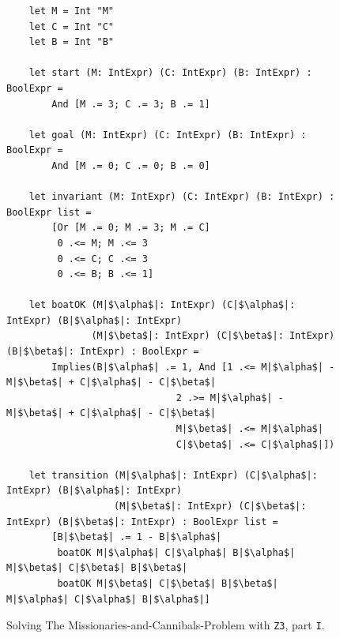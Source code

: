 \begin{figure}[!ht]
\centering
\begin{verbatim}
    let M = Int "M"
    let C = Int "C"
    let B = Int "B"

    let start (M: IntExpr) (C: IntExpr) (B: IntExpr) : BoolExpr =
        And [M .= 3; C .= 3; B .= 1]

    let goal (M: IntExpr) (C: IntExpr) (B: IntExpr) : BoolExpr =
        And [M .= 0; C .= 0; B .= 0]

    let invariant (M: IntExpr) (C: IntExpr) (B: IntExpr) : BoolExpr list =
        [Or [M .= 0; M .= 3; M .= C]
         0 .<= M; M .<= 3
         0 .<= C; C .<= 3
         0 .<= B; B .<= 1]

    let boatOK (M|$\alpha$|: IntExpr) (C|$\alpha$|: IntExpr) (B|$\alpha$|: IntExpr)
               (M|$\beta$|: IntExpr) (C|$\beta$|: IntExpr) (B|$\beta$|: IntExpr) : BoolExpr =
        Implies(B|$\alpha$| .= 1, And [1 .<= M|$\alpha$| - M|$\beta$| + C|$\alpha$| - C|$\beta$|
                              2 .>= M|$\alpha$| - M|$\beta$| + C|$\alpha$| - C|$\beta$|
                              M|$\beta$| .<= M|$\alpha$|
                              C|$\beta$| .<= C|$\alpha$|])

    let transition (M|$\alpha$|: IntExpr) (C|$\alpha$|: IntExpr) (B|$\alpha$|: IntExpr)
                   (M|$\beta$|: IntExpr) (C|$\beta$|: IntExpr) (B|$\beta$|: IntExpr) : BoolExpr list =
        [B|$\beta$| .= 1 - B|$\alpha$|
         boatOK M|$\alpha$| C|$\alpha$| B|$\alpha$| M|$\beta$| C|$\beta$| B|$\beta$|
         boatOK M|$\beta$| C|$\beta$| B|$\beta$| M|$\alpha$| C|$\alpha$| B|$\alpha$|]
\end{verbatim}
\vspace*{-0.3cm}
\caption{Solving The Missionaries-and-Cannibals-Problem with \texttt{Z3}, part \texttt{I}.}
\label{fig:Missionaries-Z3.ipynb-1}
\end{figure}

